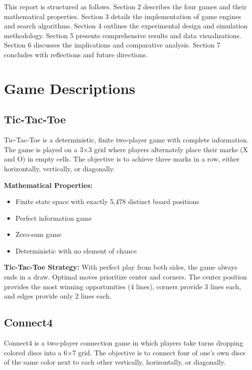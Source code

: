 \documentclass[12pt]{article}
\begin{document}
This report is structured as follows. Section 2 describes the four games and their mathematical properties. Section 3 details the implementation of game engines and search algorithms. Section 4 outlines the experimental design and simulation methodology. Section 5 presents comprehensive results and data visualizations. Section 6 discusses the implications and comparative analysis. Section 7 concludes with reflections and future directions.

\section{Game Descriptions}

\subsection{Tic-Tac-Toe}

Tic-Tac-Toe is a deterministic, finite two-player game with complete information. The game is played on a 3×3 grid where players alternately place their marks (X and O) in empty cells. The objective is to achieve three marks in a row, either horizontally, vertically, or diagonally.

\textbf{Mathematical Properties:}
\begin{itemize}
    \item Finite state space with exactly 5,478 distinct board positions
    \item Perfect information game
    \item Zero-sum game
    \item Deterministic with no element of chance
\end{itemize}

\textbf{Tic-Tac-Toe Strategy:} With perfect play from both sides, the game always ends in a draw. Optimal moves prioritize center and corners. The center position provides the most winning opportunities (4 lines), corners provide 3 lines each, and edges provide only 2 lines each.

\subsection{Connect4}

Connect4 is a two-player connection game in which players take turns dropping colored discs into a 6×7 grid. The objective is to connect four of one's own discs of the same color next to each other vertically, horizontally, or diagonally.
\end{document}
